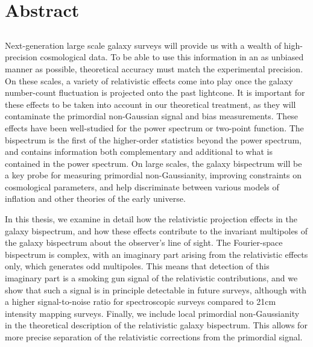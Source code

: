 \chapter*{Abstract}
\label{ch:abstract}
\section*{}
\singlespacing


Next-generation large scale galaxy surveys will provide us with a wealth of high-precision cosmological data. To be able to use this information in an as unbiased manner as possible, theoretical accuracy must match the experimental precision. On these scales, a variety of relativistic effects come into play once the galaxy number-count fluctuation is projected onto the past lightcone. It is important for these effects to be taken into account in our theoretical treatment, as they will contaminate the primordial non-Gaussian signal and bias measurements. These effects have been well-studied for the power spectrum or two-point function. The bispectrum is the first of the higher-order statistics beyond the power spectrum, and contains information both complementary and additional to what is contained in the power spectrum. On large scales, the galaxy bispectrum will be a key probe for measuring primordial non-Gaussianity, improving constraints on cosmological parameters, and help discriminate between various models of inflation and other theories of the early universe. 

In this thesis, we examine in detail how the relativistic projection effects in the galaxy bispectrum, and how these effects contribute to the invariant multipoles of the galaxy bispectrum about the observer's line of sight. The Fourier-space bispectrum is complex, with an imaginary part arising from the relativistic effects only, which generates odd multipoles. This means that detection of this imaginary part is a smoking gun signal of the relativistic contributions, and we show that such a signal is in principle detectable in future surveys, although with a higher signal-to-noise ratio for spectroscopic surveys compared to 21cm intensity mapping surveys. Finally, we include local primordial non-Gaussianity in the theoretical description of the relativistic galaxy bispectrum. This allows for more precise separation of the relativistic corrections from the primordial signal.

